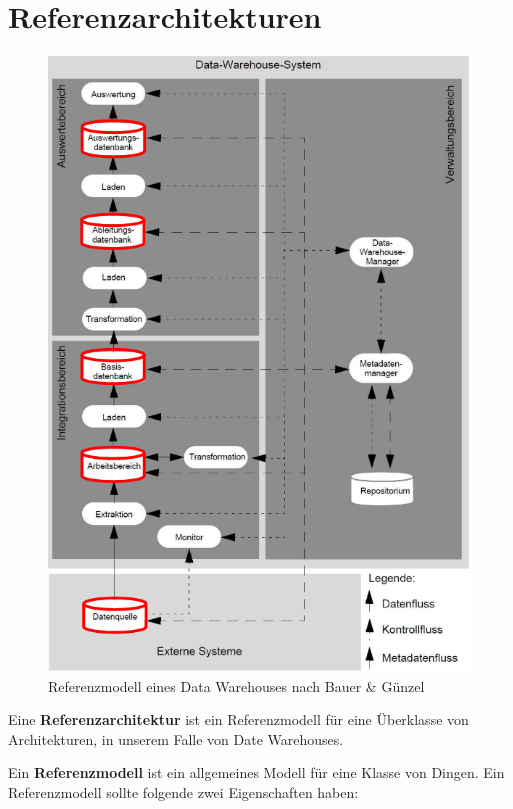\documentclass[a4paper, 11pt]{article}
\begin{document}
\section{Referenzarchitekturen}
\begin{figure}
	\centering
	\includegraphics[keepaspectratio=true,height=18\baselineskip]{refModell.png}
	\caption{Referenzmodell eines Data Warehouses nach Bauer \& Günzel}
	\label{fig:refModel}
\end{figure}


Eine \textbf{Referenzarchitektur} ist ein Referenzmodell für eine Überklasse von Architekturen, in unserem Falle von Date Warehouses.

Ein \textbf{Referenzmodell} ist ein allgemeines Modell für eine Klasse von Dingen. Ein Referenzmodell sollte folgende zwei Eigenschaften haben:
\end{document}

